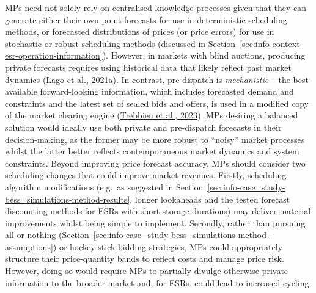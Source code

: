 \documentclass[12pt,a4paper,]{report}
\begin{document}
MPs need not solely rely on centralised knowledge processes given that
they can generate either their own point forecasts for use in
deterministic scheduling methods, or forecasted distributions of prices
(or price errors) for use in stochastic or robust scheduling methods
(discussed in Section~\ref{sec:info-context-esr-operation-information}).
However, in markets with blind auctions, producing private forecasts
requires using historical data that likely reflect past market dynamics
(\protect\hyperlink{ref-lagoForecastingDayaheadElectricity2021}{Lago et
al., 2021a}). In contrast, pre-dispatch is \emph{mechanistic} -- the
best-available forward-looking information, which includes forecasted
demand and constraints and the latest set of sealed bids and offers, is
used in a modified copy of the market clearing engine
(\protect\hyperlink{ref-trebbienUnderstandingElectricityPrices2023}{Trebbien
et al., 2023}). MPs desiring a balanced solution would ideally use both
private and pre-dispatch forecasts in their decision-making, as the
former may be more robust to ``noisy'' market processes whilst the
latter better reflects contemporaneous market dynamics and system
constraints. Beyond improving price forecast accuracy, MPs should
consider two scheduling changes that could improve market revenues.
Firstly, scheduling algorithm modifications (e.g.~as suggested in
Section~\ref{sec:info-case_study-bess_simulations-method-results},
longer lookaheads and the tested forecast discounting methods for ESRs
with short storage durations) may deliver material improvements whilst
being simple to implement. Secondly, rather than pursuing all-or-nothing
(Section~\ref{sec:info-case_study-bess_simulations-method-assumptions})
or hockey-stick bidding strategies, MPs could appropriately structure
their price-quantity bands to reflect costs and manage price risk.
However, doing so would require MPs to partially divulge otherwise
private information to the broader market and, for ESRs, could lead to
increased cycling.
\end{document}
